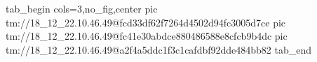  
 
 
 
 

\qqSecOrig


\ifcmt
  tab_begin cols=3,no_fig,center
    pic tm://18_12_22.10.46.49@fcd33df62f7264d4502d94fc3005d7ce
    pic tm://18_12_22.10.46.49@fc41e30abdce880486588e8cfcb9b4dc
    pic tm://18_12_22.10.46.49@a2f4a5ddc1f3c1cafdbf92dde484bb82
  tab_end
\fi


